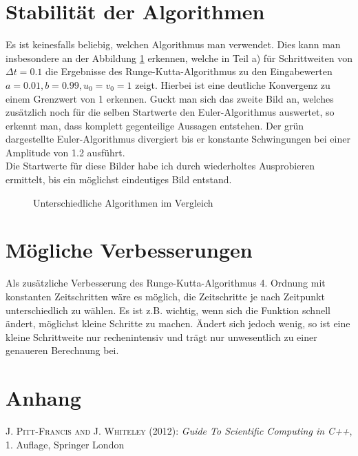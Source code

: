 \documentclass[12pt,a4paper,titlepage,headinclude,bibtotoc]{scrartcl}
\begin{document}
\section{Stabilität der Algorithmen}
Es ist keinesfalls beliebig, welchen Algorithmus man verwendet.
Dies kann man insbesondere an der Abbildung \ref{fig:stabi} erkennen, welche in Teil a) für Schrittweiten von $\Delta t=0.1$ die Ergebnisse des Runge-Kutta-Algorithmus zu den Eingabewerten $a=0.01, b=0.99, u_0=v_0=1$ zeigt.
Hierbei ist eine  deutliche Konvergenz zu einem  Grenzwert von 1 erkennen.
Guckt man sich das zweite Bild an, welches zusätzlich noch für die selben Startwerte den Euler-Algorithmus auswertet, so erkennt man, dass komplett gegenteilige Aussagen entstehen.
Der grün dargestellte Euler-Algorithmus divergiert bis er konstante Schwingungen bei einer Amplitude von 1.2 ausführt.\\
Die Startwerte für diese Bilder habe ich durch wiederholtes Ausprobieren ermittelt, bis ein möglichst eindeutiges Bild entstand.
\begin{figure}[h]
  \centering
   \hfill
   \caption{Unterschiedliche Algorithmen im Vergleich}
   \label{fig:stabi}
 \end{figure}

\section{Mögliche Verbesserungen}
Als zusätzliche Verbesserung des Runge-Kutta-Algorithmus 4. Ordnung mit konstanten Zeitschritten wäre es möglich, die Zeitschritte je nach Zeitpunkt unterschiedlich zu wählen.
Es ist z.B. wichtig, wenn sich die Funktion schnell ändert, möglichst kleine Schritte zu machen.
Ändert sich jedoch wenig, so ist eine kleine Schrittweite nur rechenintensiv und trägt nur unwesentlich zu einer genaueren Berechnung bei.

\section*{Anhang}
\begin{thebibliography}{1000}

	\textsc{J. Pitt-Francis and J. Whiteley} (2012): \emph{Guide To Scientific Computing in C++},
	1. Auflage, Springer London

\end{thebibliography}



 
\end{document}
